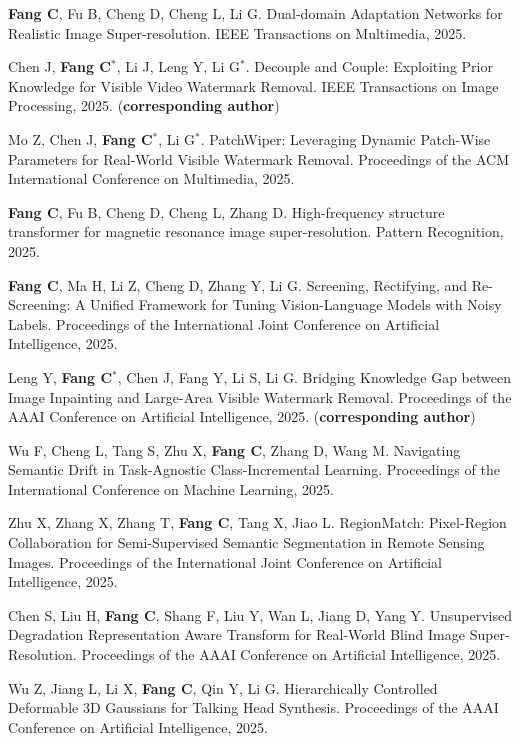 \documentclass[a4paper,36pt]{article}
\newcommand{\tb}[1]{\textbf{#1}}
\newcommand{\resumeItemWithoutTitle}[1]{
  \item\justifying\small{
    {#1 \vspace{-2pt}}
  }
}
\begin{document}
\resumeItemWithoutTitle{\tb{Fang C}, Fu B, Cheng D, Cheng L, Li G. Dual-domain Adaptation Networks for Realistic Image Super-resolution. IEEE Transactions on Multimedia, 2025.}

\resumeItemWithoutTitle{Chen J, \tb{Fang C}$^\ast$, Li J, Leng Y, Li G$^\ast$. Decouple and Couple: Exploiting Prior Knowledge for Visible Video Watermark Removal. IEEE Transactions on Image Processing, 2025. (\tb{corresponding author})}

\resumeItemWithoutTitle{Mo Z, Chen J, \tb{Fang C}$^\ast$, Li G$^\ast$. PatchWiper: Leveraging Dynamic Patch-Wise Parameters for Real-World Visible Watermark Removal. Proceedings of the ACM International Conference on Multimedia, 2025.}


\resumeItemWithoutTitle{\tb{Fang C}, Fu B, Cheng D, Cheng L, Zhang D. High-frequency structure transformer for magnetic resonance image super-resolution. Pattern Recognition, 2025.}

\resumeItemWithoutTitle{\tb{Fang C}, Ma H, Li Z, Cheng D, Zhang Y, Li G. Screening, Rectifying, and Re-Screening: A Unified Framework for Tuning Vision-Language Models with Noisy Labels. Proceedings of the International Joint Conference on Artificial Intelligence, 2025.} 
\resumeItemWithoutTitle{Leng Y, \tb{Fang C}$^{\ast}$, Chen J, Fang Y, Li S, Li G. Bridging Knowledge Gap between Image Inpainting and Large-Area Visible Watermark Removal. Proceedings of the AAAI Conference on Artificial Intelligence, 2025. (\tb{corresponding author})}
\resumeItemWithoutTitle{Wu F, Cheng L, Tang S, Zhu X, \tb{Fang C}, Zhang D, Wang M. Navigating Semantic Drift in Task-Agnostic Class-Incremental Learning. Proceedings of the International Conference on Machine Learning, 2025.}

\resumeItemWithoutTitle{Zhu X, Zhang X, Zhang T, \tb{Fang C}, Tang X, Jiao L. RegionMatch: Pixel-Region Collaboration for Semi-Supervised Semantic Segmentation in Remote Sensing Images. Proceedings of the International Joint Conference on Artificial Intelligence, 2025.}

\resumeItemWithoutTitle{Chen S, Liu H, \tb{Fang C}, Shang F, Liu Y, Wan L, Jiang D, Yang Y. Unsupervised Degradation Representation Aware Transform for Real-World Blind Image Super-Resolution. Proceedings of the AAAI Conference on Artificial Intelligence, 2025.}

\resumeItemWithoutTitle{Wu Z, Jiang L, Li X, \tb{Fang C}, Qin Y, Li G. Hierarchically Controlled Deformable 3D Gaussians for Talking Head Synthesis. Proceedings of the AAAI Conference on Artificial Intelligence, 2025.}
\end{document}
